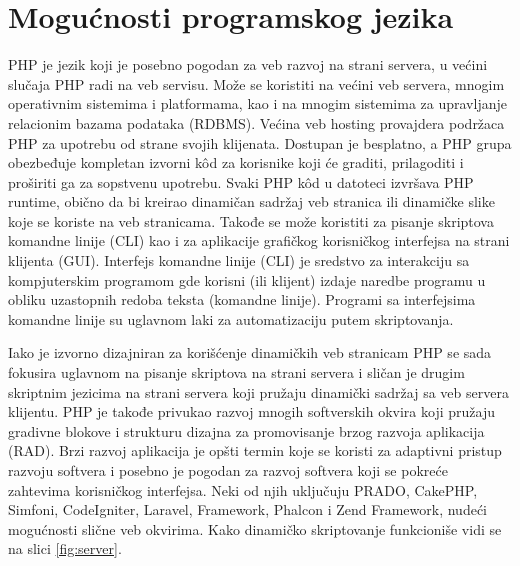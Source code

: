\documentclass[a4paper]{article}
\begin{document}
{\section{Mogućnosti programskog jezika}
PHP je jezik koji je posebno pogodan za veb razvoj na strani servera, u većini slučaja PHP radi na veb servisu. Može se koristiti na većini veb
servera, mnogim operativnim sistemima i platformama, kao i na mnogim sistemima za upravljanje relacionim bazama podataka (RDBMS). Većina veb hosting provajdera podržaca PHP za upotrebu od strane svojih klijenata. Dostupan je besplatno, a PHP grupa obezbeđuje kompletan izvorni k\^{o}d za korisnike koji će graditi, prilagoditi i proširiti ga za sopstvenu upotrebu. Svaki PHP k\^{o}d u datoteci izvršava PHP runtime\cite{php},
obično da bi kreirao dinamičan sadržaj veb stranica ili dinamičke slike koje se koriste na veb stranicama. Takođe se može koristiti za pisanje
skriptova komandne linije (CLI) kao i za aplikacije grafičkog korisničkog interfejsa na strani klijenta (GUI). Interfejs komandne linije (CLI)
je sredstvo za interakciju sa kompjuterskim programom gde korisni (ili klijent) izdaje naredbe programu u obliku uzastopnih redoba teksta (komandne linije). Programi sa interfejsima komandne linije su uglavnom laki za automatizaciju putem skriptovanja. 

Iako je izvorno dizajniran za korišćenje dinamičkih veb stranicam PHP se sada fokusira uglavnom na pisanje skriptova na strani servera i sličan je drugim skriptnim jezicima na strani servera koji pružaju dinamički sadržaj sa veb servera klijentu. PHP je takođe privukao razvoj mnogih softverskih okvira koji pružaju gradivne blokove i strukturu dizajna za promovisanje brzog razvoja aplikacija (RAD). Brzi razvoj aplikacija je opšti termin koje se koristi za adaptivni pristup razvoju softvera i posebno je pogodan za razvoj softvera koji se pokreće zahtevima korisničkog interfejsa. Neki od njih uključuju PRADO, CakePHP, Simfoni, CodeIgniter, Laravel, Framework, Phalcon i Zend Framework, nudeći mogućnosti slične veb okvirima\cite{PHPtheGoodParts}. Kako dinamičko skriptovanje funkcioniše vidi se na slici \ref{fig:server}. 


}
\end{document}
